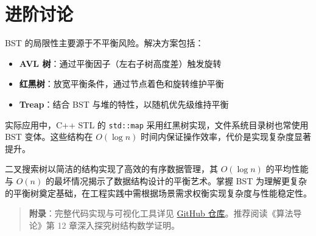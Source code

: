 \chapter{进阶讨论}
BST 的局限性主要源于不平衡风险。解决方案包括：\par
\begin{itemize}
\item \textbf{AVL 树}：通过平衡因子（左右子树高度差）触发旋转
\item \textbf{红黑树}：放宽平衡条件，通过节点着色和旋转维护平衡
\item \textbf{Treap}：结合 BST 与堆的特性，以随机优先级维持平衡
\end{itemize}
实际应用中，C++ STL 的 \texttt{std::map} 采用红黑树实现，文件系统目录树也常使用 BST 变体。这些结构在 $O(\log n)$ 时间内保证操作效率，代价是实现复杂度显著提升。\par
二叉搜索树以简洁的结构实现了高效的有序数据管理，其 $O(\log n)$ 的平均性能与 $O(n)$ 的最坏情况揭示了数据结构设计的平衡艺术。掌握 BST 为理解更复杂的平衡树奠定基础，在工程实践中需根据场景需求权衡实现复杂度与性能稳定性。\par
\begin{quote}
\textbf{附录}：完整代码实现与可视化工具详见 \href{https://github.com/example/bst-impl}{GitHub 仓库}。推荐阅读《算法导论》第 12 章深入探究树结构数学证明。\par
\end{quote}
